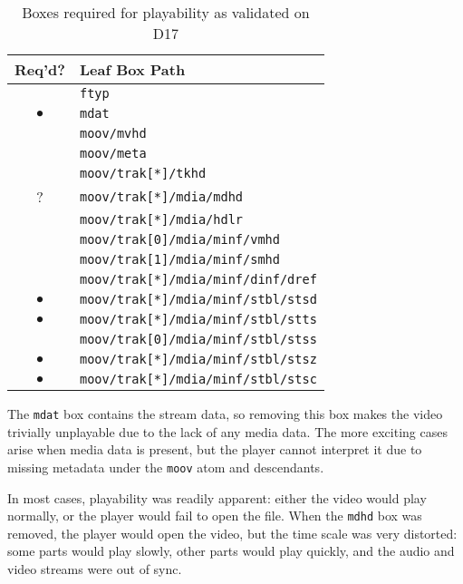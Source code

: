 \begin{table}
    \centering
    \begin{tabular}{|c|l|}
        \hline
        \textbf{Req'd?} & \textbf{Leaf Box Path} \\
        \hline \hline
        & \texttt{ftyp} \\
        \( \bullet \) & \texttt{mdat} \\
        & \texttt{moov/mvhd} \\
        & \texttt{moov/meta} \\
        & \texttt{moov/trak[*]/tkhd} \\
        ? & \texttt{moov/trak[*]/mdia/mdhd} \\
        & \texttt{moov/trak[*]/mdia/hdlr} \\
        & \texttt{moov/trak[0]/mdia/minf/vmhd} \\
        & \texttt{moov/trak[1]/mdia/minf/smhd} \\
        & \texttt{moov/trak[*]/mdia/minf/dinf/dref} \\
        \( \bullet \) & \texttt{moov/trak[*]/mdia/minf/stbl/stsd} \\
        \( \bullet \) & \texttt{moov/trak[*]/mdia/minf/stbl/stts} \\
        & \texttt{moov/trak[0]/mdia/minf/stbl/stss} \\
        \( \bullet \) & \texttt{moov/trak[*]/mdia/minf/stbl/stsz} \\
        \( \bullet \) & \texttt{moov/trak[*]/mdia/minf/stbl/stsc} \\
        \hline
    \end{tabular}
    \caption{Boxes required for playability as validated on D17}
    \label{tab:leaf-box-playability}
\end{table}

The \texttt{mdat} box contains the stream data, so removing this box makes the video trivially unplayable due to the lack of any media data. The more exciting cases arise when media data is present, but the player cannot interpret it due to missing metadata under the \texttt{moov} atom and descendants.

In most cases, playability was readily apparent: either the video would play normally, or the player would fail to open the file. When the \texttt{mdhd} box was removed, the player would open the video, but the time scale was very distorted: some parts would play slowly, other parts would play quickly, and the audio and video streams were out of sync.

